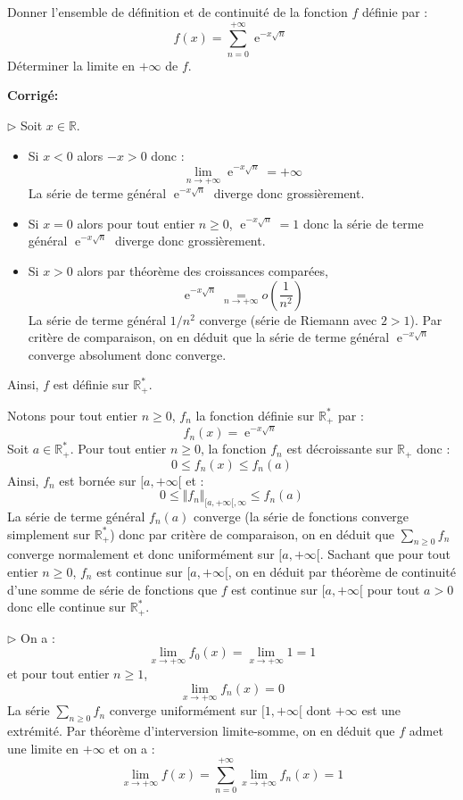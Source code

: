 \documentclass[a4paper,twoside,french,11pt]{VcCours}
\DeclareMathOperator{\e}{e}
\newcommand{\Sum}[2]{\sum_{#1}^{#2}}
\newcommand{\corr}{\textbf{Corrigé:}}
\begin{document}
\medskip


\begin{Exercice}{} Donner l'ensemble de définition et de continuité de la fonction $f$ définie par :
  \[
  f(x) = \sum_{n = 0}^{ + \infty} \e^{ - x\sqrt n}
  \]
 Déterminer la limite en $ + \infty$ de $f$.
 \end{Exercice}
 
 \corr 

$\rhd$ Soit $x \in \mathbb{R}$.
\begin{itemize}
\item Si $x<0$ alors $-x>0$ donc :
$$ \lim_{n \rightarrow + \infty} \e^{ - x\sqrt n} = + \infty$$
La série de terme général $\e^{ - x\sqrt n}$ diverge donc grossièrement.
\item Si $x=0$ alors pour tout entier $n \geq 0$, $\e^{ - x\sqrt n}=1$ donc la série de terme général $\e^{ - x\sqrt n}$ diverge donc grossièrement.
\item Si $x>0$ alors par théorème des croissances comparées,
$$ \e^{ - x\sqrt n}  \underset{n \rightarrow + \infty}{=} o \left( \dfrac{1}{n^2} \right)$$
La série de terme général $1/n^2$ converge (série de Riemann avec $2>1$). Par critère de comparaison, on en déduit que la série de terme général $ \e^{ - x\sqrt n} $ converge absolument donc converge.
\end{itemize}
Ainsi, $f$ est définie sur $\mathbb{R}_+^*$.

\bigskip

Notons pour tout entier $n \geq 0$, $f_n$ la fonction définie sur $\mathbb{R}_+^*$ par :
$$f_n(x)= \e^{ - x\sqrt n}$$
Soit $a \in \mathbb{R}_+^*$. Pour tout entier $n \geq 0$, la fonction $f_n$ est décroissante sur $\mathbb{R}_+$ donc :
$$ 0 \leq f_n(x) \leq f_n(a)$$
Ainsi, $f_n$ est bornée sur $[a, + \infty[$ et :
$$ 0 \leq \Vert f_n \Vert_{[a, + \infty[, \infty} \leq f_n(a)$$
La série de terme général $f_n(a)$ converge (la série de fonctions converge simplement sur $\mathbb{R}_+^*$) donc par critère de comparaison, on en déduit que $\Sum{n\geq 0}{} f_n$ converge normalement et donc uniformément sur $[a, + \infty[$. Sachant que pour tout entier $n \geq 0$, $f_n$ est continue sur $[a, + \infty[$, on en déduit par théorème de continuité d'une somme de série de fonctions que $f$ est continue sur $[a, + \infty[$ pour tout $a>0$ donc elle continue sur $\mathbb{R}_+^*$.

\medskip

$\rhd$ On a :
$$ \lim_{x \rightarrow + \infty} f_0(x) = \lim_{x \rightarrow + \infty} 1 = 1$$
et pour tout entier $n \geq 1$,
$$ \lim_{x \rightarrow + \infty} f_n(x) = 0$$
La série $\Sum{n\geq 0}{} f_n$ converge uniformément sur $[1, + \infty[$ dont $+ \infty$ est une extrémité. Par théorème d'interversion limite-somme, on en déduit que $f$ admet une limite en $+ \infty$ et on a :
$$ \lim_{x \rightarrow + \infty} f(x) = \sum_{n=0}^{+ \infty} \lim_{x \rightarrow + \infty} f_n(x) = 1$$
\end{document}
